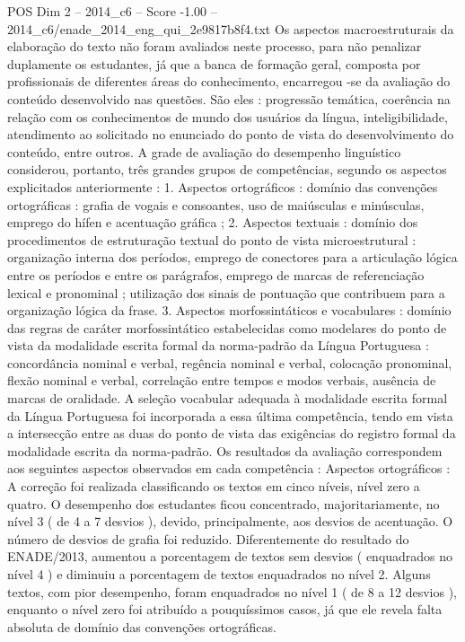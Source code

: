 \begin{textsample}{POS Dim 2 – 2014\_c6 – Score -1.00 – 2014\_c6/enade\_2014\_eng\_qui\_2e9817b8f4.txt}
Os aspectos macroestruturais da elaboração do texto não foram avaliados neste processo, para não penalizar duplamente os estudantes, já que a banca de formação geral, composta por profissionais de diferentes áreas do conhecimento, encarregou -se da avaliação do conteúdo desenvolvido nas questões.
São eles : progressão temática, coerência na relação com os conhecimentos de mundo dos usuários da língua, inteligibilidade, atendimento ao solicitado no enunciado do ponto de vista do desenvolvimento do conteúdo, entre outros.
A grade de avaliação do desempenho linguístico considerou, portanto, três grandes grupos de competências, segundo os aspectos explicitados anteriormente : 1.
Aspectos ortográficos : domínio das convenções ortográficas : grafia de vogais e consoantes, uso de maiúsculas e minúsculas, emprego do hífen e acentuação gráfica ; 2.
Aspectos textuais : domínio dos procedimentos de estruturação textual do ponto de vista microestrutural : organização interna dos períodos, emprego de conectores para a articulação lógica entre os períodos e entre os parágrafos, emprego de marcas de referenciação lexical e pronominal ; utilização dos sinais de pontuação que contribuem para a organização lógica da frase. 3.
Aspectos morfossintáticos e vocabulares : domínio das regras de caráter morfossintático estabelecidas como modelares do ponto de vista da modalidade escrita formal da norma-padrão da Língua Portuguesa : concordância nominal e verbal, regência nominal e verbal, colocação pronominal, flexão nominal e verbal, correlação entre tempos e modos verbais, ausência de marcas de oralidade.
A seleção vocabular adequada à modalidade escrita formal da Língua Portuguesa foi incorporada a essa última competência, tendo em vista a intersecção entre as duas do ponto de vista das exigências do registro formal da modalidade escrita da norma-padrão.
Os resultados da avaliação correspondem aos seguintes aspectos observados em cada competência : Aspectos ortográficos : A correção foi realizada classificando os textos em cinco níveis, nível zero a quatro.
O desempenho dos estudantes ficou concentrado, majoritariamente, no nível 3 ( de 4 a 7 desvios ), devido, principalmente, aos desvios de acentuação.
O número de desvios de grafia foi reduzido.
Diferentemente do resultado do ENADE/2013, aumentou a porcentagem de textos sem desvios ( enquadrados no nível 4 ) e diminuiu a porcentagem de textos enquadrados no nível 2.
Alguns textos, com pior desempenho, foram enquadrados no nível 1 ( de 8 a 12 desvios ), enquanto o nível zero foi atribuído a pouquíssimos casos, já que ele revela falta absoluta de domínio das convenções ortográficas.

\end{textsample}
